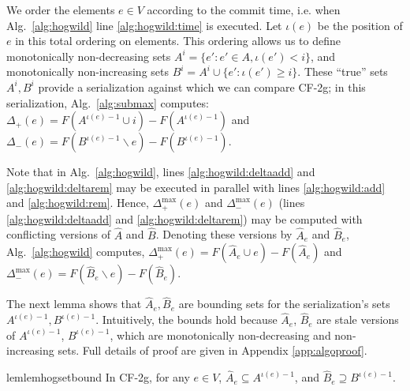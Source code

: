 \documentclass{article} %
\newcommand{\hogwild}{CF-2g}
\newcommand{\algref}[1]{Alg.~\ref{#1}}
\begin{document}
We order the elements $e \in V$ according to the commit time, i.e. when \algref{alg:hogwild} line \ref{alg:hogwild:time} is executed.
Let $\iota(e)$ be the position of $e$ in this total ordering on elements.
This ordering allows us to define monotonically non-decreasing sets $A^i = \{e' : e' \in A, \iota(e') < i\}$, and monotonically non-increasing sets $B^i = A^i \cup \{e': \iota(e') \geq i\}$.
These ``true'' sets $A^i, B^i$ provide a serialization against which we can compare \hogwild{}; in this serialization, \algref{alg:submax} computes:
$\Delta_{+}       (e) = F(A^{\iota(e)-1}\cup i) - F(A^{\iota(e)-1})$
and
$\Delta_{-}       (e) = F(B^{\iota(e)-1}\backslash e) - F(B^{\iota(e)-1})$.

Note that in \algref{alg:hogwild}, lines \ref{alg:hogwild:deltaadd} and \ref{alg:hogwild:deltarem} may be executed in parallel with lines \ref{alg:hogwild:add} and \ref{alg:hogwild:rem}.
Hence, $\Delta_+^{\max}(e)$ and $\Delta_-^{\max}(e)$ (lines \ref{alg:hogwild:deltaadd} and \ref{alg:hogwild:deltarem}) may be computed with conflicting versions of $\hat{A}$ and $\hat{B}$.
Denoting these versions by $\hat{A}_e$ and $\hat{B}_e$, \algref{alg:hogwild} computes,
$\Delta_{+}^{\max}(e) = F(\hat{A}_e\cup e) - F(\hat{A}_e)$
and
$\Delta_{-}^{\max}(e) = F(\hat{B}_e\backslash e) - F(\hat{B}_e)$.

The next lemma shows that $\hat{A}_e, \hat{B}_e$ are bounding sets for the serialization's sets $A^{\iota(e)-1}, B^{\iota(e)-1}$.
Intuitively, the bounds hold because $\hat{A}_e$, $\hat{B}_e$ are stale versions of $A^{\iota(e)-1}$, $B^{\iota(e)-1}$, which are monotonically non-decreasing and non-increasing sets.
Full details of proof are given in Appendix \ref{app:algoproof}.

\begin{restatable}{lem}{lemhogsetbound}\label{lem:hog:set_bound}
In \hogwild{}, for any $e\in V$, $\hat{A}_e \subseteq A^{\iota(e)-1}$, and $\hat{B}_e \supseteq B^{\iota(e)-1}$.
\end{restatable}
\end{document}
